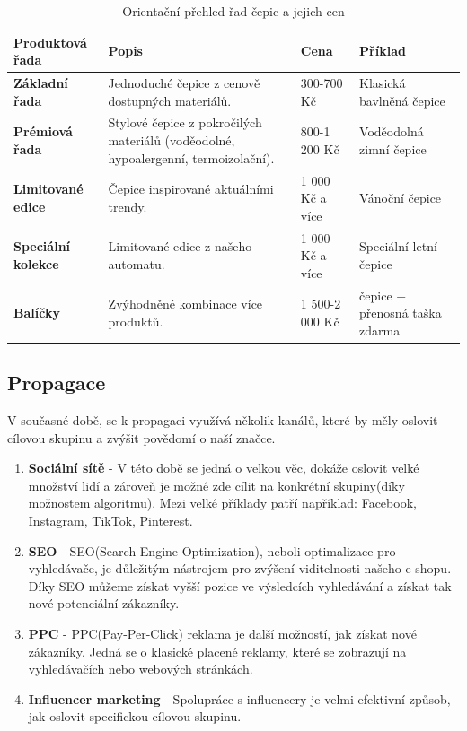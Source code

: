 \documentclass[12pt, a4paper]{article}
\begin{document}
\renewcommand{\arraystretch}{1.2}

\begin{table}[h!]
  \centering
  \begin{tabularx}{\textwidth}{ |>{\raggedright\arraybackslash}X||>{\raggedright\arraybackslash}X|X|>{\raggedright\arraybackslash}X| }
    \hline
    \textbf{Produktová řada} & \textbf{Popis} & \textbf{Cena} & \textbf{Příklad} \\
    \hline
    \hline
    \textbf{Základní řada} 
    & Jednoduché čepice z cenově dostupných materiálů. 
    & 300-700 Kč 
    & Klasická bavlněná čepice \\
    \hline
    \textbf{Prémiová řada} 
    & Stylové čepice z pokročilých materiálů (voděodolné, hypoalergenní, termoizolační). 
    & 800-1 200 Kč 
    & Voděodolná zimní čepice \\
    \hline
    \textbf{Limitované edice} 
    & Čepice inspirované aktuálními trendy. 
    & 1 000 Kč a více 
    & Vánoční čepice \\
    \hline
    \textbf{Speciální kolekce} 
    & Limitované edice z našeho automatu. 
    & 1 000 Kč a více 
    & Speciální letní čepice \\
    \hline
    \textbf{Balíčky} 
    & Zvýhodněné kombinace více produktů. 
    & 1 500-2 000 Kč 
    & 2 čepice + přenosná taška zdarma \\
    \hline
  \end{tabularx}
  \caption{Orientační přehled řad čepic a jejich cen}
\end{table}

\pagebreak

\subsection{Propagace}

V současné době, se k propagaci využívá
několik kanálů, které by měly oslovit cílovou skupinu a zvýšit povědomí o naší značce.

\begin{enumerate}
  \item \textbf{Sociální sítě} - V této době se jedná o velkou věc,
  dokáže oslovit velké množství lidí a zároveň je možné zde cílit na konkrétní skupiny(díky možnostem algoritmu).
  Mezi velké příklady patří například: Facebook, Instagram, TikTok, Pinterest.
  \item \textbf{SEO} - SEO(Search Engine Optimization), neboli optimalizace pro vyhledávače, je důležitým nástrojem pro zvýšení viditelnosti našeho e-shopu.
  Díky SEO můžeme získat vyšší pozice ve výsledcích vyhledávání a získat tak nové potenciální zákazníky.
  \item \textbf{PPC} - PPC(Pay-Per-Click) reklama je další možností, jak získat nové zákazníky.
  Jedná se o klasické placené reklamy, které se zobrazují na vyhledávačích nebo webových stránkách.
  \item \textbf{Influencer marketing} - Spolupráce s influencery je velmi efektivní způsob, jak oslovit specifickou cílovou skupinu.
\end{enumerate}
\end{document}
